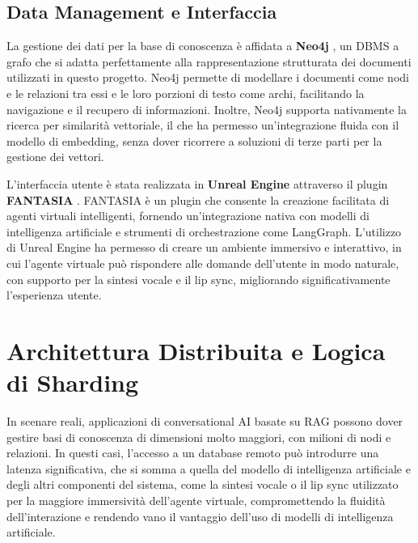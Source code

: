 \subsection{Data Management e Interfaccia}

La gestione dei dati per la base di conoscenza è affidata a \textbf{Neo4j} \cite{neo4j}, un DBMS a grafo che si adatta perfettamente alla rappresentazione strutturata dei documenti utilizzati in questo progetto. Neo4j permette di modellare i documenti come nodi e le relazioni tra essi e le loro porzioni di testo come archi, facilitando la navigazione e il recupero di informazioni. Inoltre, Neo4j supporta nativamente la ricerca per similarità vettoriale, il che ha permesso un'integrazione fluida con il modello di embedding, senza dover ricorrere a soluzioni di terze parti per la gestione dei vettori.

L'interfaccia utente è stata realizzata in \textbf{Unreal Engine} \cite{ue} attraverso il plugin \textbf{FANTASIA} \cite{fantasia1, fantasia2}. FANTASIA è un plugin che consente la creazione facilitata di agenti virtuali intelligenti, fornendo un'integrazione nativa con modelli di intelligenza artificiale e strumenti di orchestrazione come LangGraph. L'utilizzo di Unreal Engine ha permesso di creare un ambiente immersivo e interattivo, in cui l'agente virtuale può rispondere alle domande dell'utente in modo naturale, con supporto per la sintesi vocale e il lip sync, migliorando significativamente l'esperienza utente.

\section{Architettura Distribuita e Logica di Sharding}

In scenare reali, applicazioni di conversational AI basate su RAG possono dover gestire basi di conoscenza di dimensioni molto maggiori, con milioni di nodi e relazioni. In questi casi, l'accesso a un database remoto può introdurre una latenza significativa, che si somma a quella del modello di intelligenza artificiale e degli altri componenti del sistema, come la sintesi vocale o il lip sync utilizzato per la maggiore immersività dell'agente virtuale, compromettendo la fluidità dell'interazione \cite{latency_eca} e rendendo vano il vantaggio dell'uso di modelli di intelligenza artificiale.

